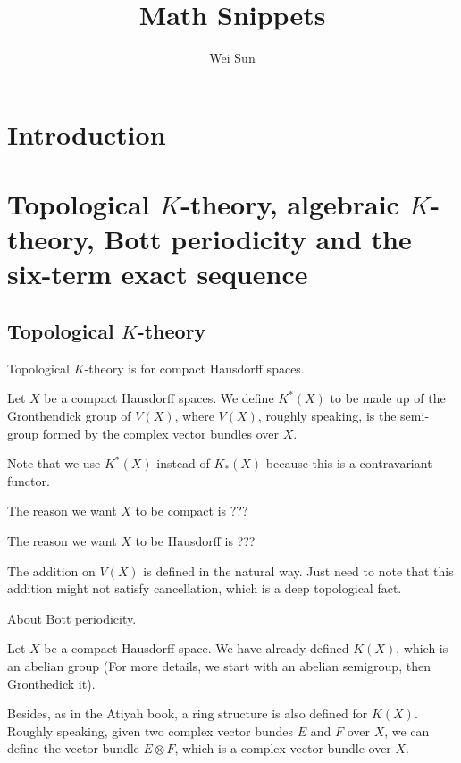 \documentclass[a5paper]{article}
\title{Math Snippets}
\author{Wei Sun}
\begin{document}

\maketitle


\section{Introduction}


\section{Topological $K$-theory, algebraic $K$-theory, Bott periodicity and the six-term exact sequence}


\subsection{Topological $K$-theory}


Topological $K$-theory is for compact Hausdorff spaces.

\twomm

Let $X$ be a compact Hausdorff spaces. We define $K^*(X)$ to be made up of the Gronthendick group of $V(X)$, where $V(X)$, roughly speaking, is the semi-group formed by the complex vector bundles over $X$.

Note that we use $K^*(X)$ instead of $K_*(X)$ because this is a contravariant functor.


The reason we want $X$ to be compact is  ???

The reason we want $X$ to be Hausdorff is  ???

The addition on $V(X)$ is defined in the natural way. Just need to note that this addition might not satisfy cancellation, which is a deep topological fact.

About Bott periodicity.

Let $X$ be a compact Hausdorff space. We have already defined $K(X)$, which is an abelian group (For more details, we start with an abelian semigroup, then Gronthedick it).

Besides, as in the Atiyah book, a ring structure is also defined for $K(X)$. Roughly speaking, given two complex vector bundes $E$ and $F$ over $X$, we can define the vector bundle $E \otimes F$, which is a complex vector bundle over $X$.
\end{document}
